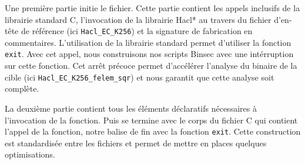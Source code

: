 Une première partie initie le fichier. Cette partie contient les appels inclusifs de la librairie standard C, l'invocation de la librairie Hacl* au travers du fichier d'en-tête de référence (ici \texttt{Hacl\_EC\_K256}) et la signature de fabrication en commentaires. L'utilisation de la librairie standard permet d'utiliser la fonction \texttt{exit}. Avec cet appel, nous construisons nos scripts Binsec avec une intérruption sur cette fonction. Cet arrêt précoce permet d'accélérer l'analyse du binaire de la cible (ici \texttt{Hacl\_EC\_K256\_felem\_sqr}) et nous garantit que cette analyse soit complète.\smallbreak

La deuxième partie contient tous les éléments déclaratifs nécessaires à l'invocation de la fonction. Puis se termine avec le corps du fichier C qui contient l'appel de la fonction, notre balise de fin avec la fonction \texttt{exit}. Cette construction est standardisée entre les fichiers et permet de mettre en places quelques optimisations.



